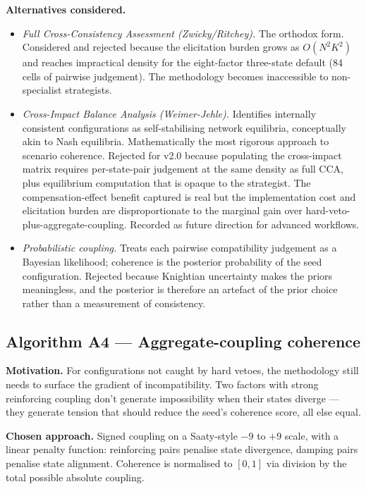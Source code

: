 \documentclass[11pt,a4paper]{article}
\begin{document}
\textbf{Alternatives considered.}

\begin{itemize}[leftmargin=*]
  \item \emph{Full Cross-Consistency Assessment (Zwicky/Ritchey).} The orthodox form. Considered and rejected because the elicitation burden grows as $O(N^2 K^2)$ and reaches impractical density for the eight-factor three-state default (84 cells of pairwise judgement). The methodology becomes inaccessible to non-specialist strategists.
  \item \emph{Cross-Impact Balance Analysis (Weimer-Jehle).} Identifies internally consistent configurations as self-stabilising network equilibria, conceptually akin to Nash equilibria. Mathematically the most rigorous approach to scenario coherence. Rejected for v2.0 because populating the cross-impact matrix requires per-state-pair judgement at the same density as full CCA, plus equilibrium computation that is opaque to the strategist. The compensation-effect benefit captured is real but the implementation cost and elicitation burden are disproportionate to the marginal gain over hard-veto-plus-aggregate-coupling. Recorded as future direction for advanced workflows.
  \item \emph{Probabilistic coupling.} Treats each pairwise compatibility judgement as a Bayesian likelihood; coherence is the posterior probability of the seed configuration. Rejected because Knightian uncertainty makes the priors meaningless, and the posterior is therefore an artefact of the prior choice rather than a measurement of consistency.
\end{itemize}

\subsection{Algorithm A4 — Aggregate-coupling coherence}

\textbf{Motivation.} For configurations not caught by hard vetoes, the methodology still needs to surface the gradient of incompatibility. Two factors with strong reinforcing coupling don't generate impossibility when their states diverge — they generate tension that should reduce the seed's coherence score, all else equal.

\textbf{Chosen approach.} Signed coupling on a Saaty-style $-9$ to $+9$ scale, with a linear penalty function: reinforcing pairs penalise state divergence, damping pairs penalise state alignment. Coherence is normalised to $[0, 1]$ via division by the total possible absolute coupling.
\end{document}
